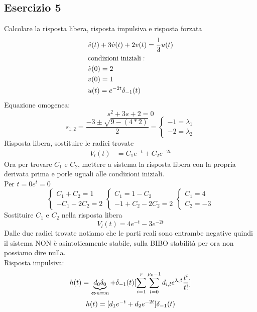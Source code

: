 	\subsection{Esercizio 5}
		Calcolare la risposta libera, risposta impulsiva e risposta forzata
		\[
		\begin{split}
		&\ddot{v}(t)+3\dot{v}(t)+2v(t) = \frac{1}{3}u(t)\\
		&\mathrm{condizioni \,\, iniziali:}\\
		&\dot{v}(0)=2\\
		&v(0)=1\\
		&u(t)=e^{-2t}\delta_{-1}(t)
		\end{split}
		\]
		Equazione omogenea:
		\[s^2 + 3s +2 = 0\]
		\[s_{1,2} = \frac{-3 \pm \sqrt{9-(4*2)}}{2}=
		\begin{cases}
		-1 = \lambda_1\\
		-2 = \lambda_2
		\end{cases}
		\]
		Risposta libera, sostituire le radici trovate
		\[
		\begin{split}
		V_l(t)&=C_1e^{-t}+C_2e^{-2t}
		\end{split}
		\]
		Ora per trovare $C_1$ e $C_2$, mettere a sistema la risposta libera con la propria derivata prima e porle uguali alle condizioni iniziali.\\
		Per $t=0 e^t = 0$
		\[
		\begin{cases}
		C_1+C_2 = 1\\
		-C_1-2C_2 = 2 
		\end{cases}
		\begin{cases}
		C_1 = 1-C_2\\
		-1+C_2-2C_2 = 2
		\end{cases}
		\begin{cases}
		C_1 = 4\\
		C_2 = -3
		\end{cases}
		\]
		Sostituire $C_1$ e $C_2$ nella risposta libera
		\[V_l(t) = 4e^{-t}-3e^{-2t}\]
		Dalle due radici trovate notiamo che le parti reali sono entrambe negative quindi il sistema NON è asintoticamente stabile, sulla BIBO stabilità per ora non possiamo dire nulla.\\
		Risposta impulsiva:\\
		\[
		h(t)= \underbrace{d_0\delta_0}_{\Leftrightarrow n=m}  + \delta_{-1}(t)[\sum_{i = 1}^{r}\sum_{l=0}^{\mu_0-1}d_{i,l}e^{\lambda_it}\frac{t^l}{t!}]
		\]
		\[ h(t)=[d_1e^{-t} + d_2e^{-2t}] \delta_{-1}(t)\]
